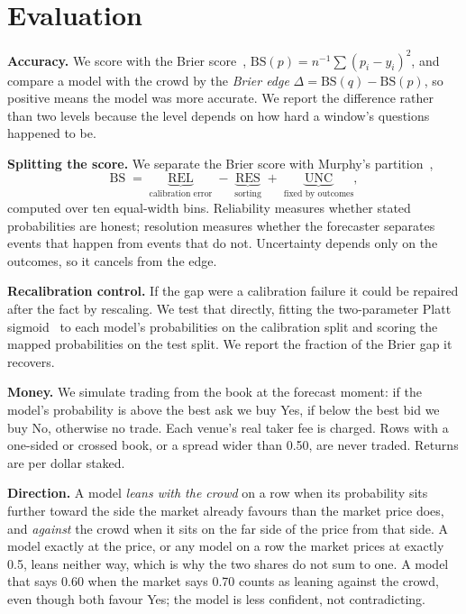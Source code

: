 \section{Evaluation}
\label{sec:evaluation}

\textbf{Accuracy.} We score with the Brier score~\citep{brier1950},
$\mathrm{BS}(p) = n^{-1}\sum(p_i - y_i)^2$, and compare a model with the crowd
by the \emph{Brier edge} $\Delta = \mathrm{BS}(q) - \mathrm{BS}(p)$, so positive
means the model was more accurate. We report the difference rather than two
levels because the level depends on how hard a window's questions happened to be.

\textbf{Splitting the score.} We separate the Brier score with Murphy's
partition~\citep{murphy1973},
\begin{equation}
\mathrm{BS} \;=\; \underbrace{\mathrm{REL}}_{\text{calibration error}}
\;-\; \underbrace{\mathrm{RES}}_{\text{sorting}}
\;+\; \underbrace{\mathrm{UNC}}_{\text{fixed by outcomes}},
\label{eq:murphy}
\end{equation}
computed over ten equal-width bins. Reliability measures whether stated
probabilities are honest; resolution measures whether the forecaster separates
events that happen from events that do not. Uncertainty depends only on the
outcomes, so it cancels from the edge.

\textbf{Recalibration control.} If the gap were a calibration failure it could be
repaired after the fact by rescaling. We test that directly, fitting the
two-parameter Platt sigmoid~\citep{platt1999} to each model's probabilities on the
calibration split and scoring the mapped probabilities on the test split. We
report the fraction of the Brier gap it recovers.

\textbf{Money.} We simulate trading from the book at the forecast moment: if the
model's probability is above the best ask we buy Yes, if below the best bid we
buy No, otherwise no trade. Each venue's real taker fee is charged. Rows with a
one-sided or crossed book, or a spread wider than 0.50, are never traded. Returns
are per dollar staked.

\textbf{Direction.} A model \emph{leans with the crowd} on a row when its
probability sits further toward the side the market already favours than the
market price does, and \emph{against} the crowd when it sits on the far side of
the price from that side. A model exactly at the price, or any model on a row the
market prices at exactly 0.5, leans neither way, which is why the two shares do
not sum to one. A model that says 0.60 when the market says 0.70 counts as leaning against
the crowd, even though both favour Yes; the model is less confident, not
contradicting.

